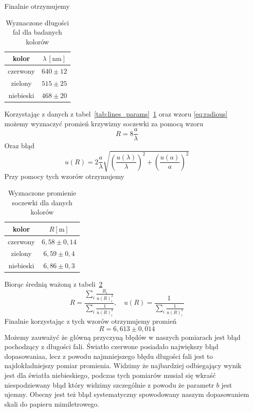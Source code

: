 \documentclass[12pt]{article}
\begin{document}
Finalnie otrzymujemy
\begin{table}[H]
	\centering
	\begin{tabular}{c|c}
		\toprule
		kolor     & \(\lambda \, [\mathrm{nm}]\) \\
		\midrule
		czerwony  & \(640 \pm 12\)               \\
		zielony   & \(515 \pm 25\)               \\
		niebieski & \(468 \pm 20\)               \\
		\bottomrule
	\end{tabular}
	\caption{Wyznaczone długości fal dla badanych kolorów}
	\label{tab:wavelength}
\end{table}

Korzystając z danych z tabel~\ref{tab:lines_params}~\ref{tab:wavelength} oraz wzoru \eqref{eq:radious} możemy wyznaczyć promień krzywizny soczewki za pomocą wzoru
\[
	R = 8\frac{a}{\lambda}
\]
Oraz błąd
\[
	u(R) = 2\frac{a}{\lambda} \sqrt{(\frac{u(\lambda)}{\lambda})^2 + (\frac{u(a)}{a})^2}
\]
Przy pomocy tych wzorów otrzymujemy

\begin{table}[H]
	\centering
	\begin{tabular}{c|c}
		\toprule
		kolor     & \(R [\mathrm{m}]\)    \\
		\midrule
		czerwony  & \(6{,}58 \pm 0{,}14\) \\
		zielony   & \(6{,}59 \pm 0{,}4\)  \\
		niebieski & \(6{,}86 \pm 0{,}3 \) \\
		\bottomrule
	\end{tabular}
	\caption{Wyznaczone promienie soczewki dla danych kolorów}
	\label{tab:radious}
\end{table}

Biorąc średnią ważoną z tabeli~\ref{tab:radious}
\[
	R = \frac{\sum_i \frac{R_i}{u(R)_i^2}}{\sum_i \frac{1}{u(R)_i^2}}, \quad u(R) = \frac{1}{\sum_i \frac{1}{u(R)_i^2}}
\]
Finalnie korzystając z tych wzorów otrzymujemy promień
\[
	R = 6{,}613 \pm 0{,}014
\]
Możemy zauważyć że główną przyczyną błędów w naszych pomiarach jest błąd pochodzący z długości fali. Światło czerwone posiadało największy błąd dopasowaniaa, lecz z powodu najmniejszego błędu długości fali jest to najdokładniejszy pomiar promienia. Widzimy że najbardziej odbiegający wynik jest dla światła niebieskiego, podczas tych pomiarów musiał się wkraść niespodziewany błąd który widzimy szczególnie z powodu że parametr \(b\) jest ujemny. Obecny jest też błąd systematyczny spowodowany naszym dopasowaniem skali do papieru mimiletrowego.
\end{document}
